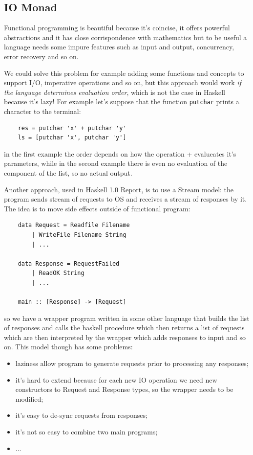\subsection{IO Monad}
Functional programming is beautiful because it's coincise, it offers powerful abstractions and it has close corrispondence with mathematics but to be useful a language needs some impure features such as input and output, concurrency, error recovery and so on.

We could solve this problem for example adding some functions and concepts to support I/O, imperative operations and so on, but this approach would work \emph{if the language determines evaluation order}, which is not the case in Haskell because it's lazy!
For example let's suppose that the function \verb|putchar| prints a character to the terminal:
\begin{verbatim}
    res = putchar 'x' + putchar 'y'
    ls = [putchar 'x', putchar 'y']
\end{verbatim}
in the first example the order depends on how the operation + evalueates it's parameters, while in the second example there is even no evaluation of the component of the list, so no actual output.

Another approach, used in Haskell 1.0 Report, is to use a Stream model: the program sends stream of requests to OS and receives a stream of responses by it.
The idea is to move side effects outside of functional program:
\begin{verbatim}
    data Request = Readfile Filename
        | WriteFile Filename String
        | ...

    data Response = RequestFailed
        | ReadOK String
        | ...

    main :: [Response] -> [Request]
\end{verbatim}
so we have a wrapper program written in some other language that builds the list of responses and calls the haskell procedure which then returns a list of requests which are then interpreted by the wrapper which adds responses to input and so on.
This model though has some problems:
\begin{itemize}
    \item laziness allow program to generate requests prior to processing any responses;
    \item it's hard to extend because for each new IO operation we need new constructors to Request and Response types, so the wrapper needs to be modified;
    \item it's easy to de-sync requests from responses;
    \item it's not so easy to combine two main programs;
    \item ...
\end{itemize}

